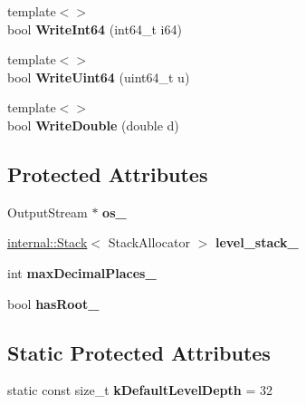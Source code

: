 \begin{DoxyCompactItemize}
\item 
{\footnotesize template$<$$>$ }\\bool {\bfseries Write\+Int64} (int64\+\_\+t i64)\hypertarget{class_writer_a3528a42394d50f3b92659de517433c85}{}\label{class_writer_a3528a42394d50f3b92659de517433c85}

\item 
{\footnotesize template$<$$>$ }\\bool {\bfseries Write\+Uint64} (uint64\+\_\+t u)\hypertarget{class_writer_a025b3d2ca07d539a7067575e95f5578d}{}\label{class_writer_a025b3d2ca07d539a7067575e95f5578d}

\item 
{\footnotesize template$<$$>$ }\\bool {\bfseries Write\+Double} (double d)\hypertarget{class_writer_af317e1d24249b8c68503a6253c703bd2}{}\label{class_writer_af317e1d24249b8c68503a6253c703bd2}

\end{DoxyCompactItemize}
\subsection*{Protected Attributes}
\begin{DoxyCompactItemize}
\item 
Output\+Stream $\ast$ {\bfseries os\+\_\+}\hypertarget{class_writer_ad24a0be4446a099a473f5f32471b13bf}{}\label{class_writer_ad24a0be4446a099a473f5f32471b13bf}

\item 
\hyperlink{classinternal_1_1_stack}{internal\+::\+Stack}$<$ Stack\+Allocator $>$ {\bfseries level\+\_\+stack\+\_\+}\hypertarget{class_writer_a285682c256cdacbe18b35a4e85b42cf4}{}\label{class_writer_a285682c256cdacbe18b35a4e85b42cf4}

\item 
int {\bfseries max\+Decimal\+Places\+\_\+}\hypertarget{class_writer_a3d4ef664c3cdf34a286b13d27adcdd4d}{}\label{class_writer_a3d4ef664c3cdf34a286b13d27adcdd4d}

\item 
bool {\bfseries has\+Root\+\_\+}\hypertarget{class_writer_affc6b9e0332b50bee0d33f8b1841c9a6}{}\label{class_writer_affc6b9e0332b50bee0d33f8b1841c9a6}

\end{DoxyCompactItemize}
\subsection*{Static Protected Attributes}
\begin{DoxyCompactItemize}
\item 
static const size\+\_\+t {\bfseries k\+Default\+Level\+Depth} = 32\hypertarget{class_writer_a0dc357519ca0c383cacecbf6911b03ad}{}\label{class_writer_a0dc357519ca0c383cacecbf6911b03ad}

\end{DoxyCompactItemize}


